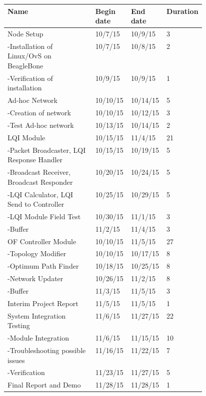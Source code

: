 \documentclass{article}
\begin{document}
\begin{tabular}{  | p{.45\linewidth} | p{0.185\linewidth} | p{0.185\linewidth} | p{0.09\linewidth} |}
\hline
\textbf{Name}	&	\textbf{Begin date}	&	\textbf{End date}	&	\textbf{Duration} \\
\hline
Node Setup	&	10/7/15	&	10/9/15	&	3 \\
-Installation of Linux/OvS on BeagleBone	&	10/7/15	&	10/8/15	&	2 \\
-Verification of installation	&	10/9/15	&	10/9/15	&	1 \\
\hline
Ad-hoc Network	&	10/10/15	&	10/14/15	&	5 \\
-Creation of network	&	10/10/15	&	10/12/15	&	3 \\
-Test Ad-hoc network	&	10/13/15	&	10/14/15	&	2 \\
\hline
LQI Module	&	10/15/15	&	11/4/15	&	21 \\
-Packet Broadcaster, LQI Response Handler	&	10/15/15	&	10/19/15	&	5 \\
-Broadcast Receiver, Broadcast Responder	&	10/20/15	&	10/24/15	&	5 \\ 
-LQI Calculator, LQI Send to Controller	&	10/25/15	&	10/29/15	&	5 \\
-LQI Module Field Test	&	10/30/15	&	11/1/15	&	3 \\
-Buffer	&	11/2/15	&	11/4/15	&	3 \\
\hline
OF Controller Module	&	10/10/15	&	11/5/15	&	27 \\
-Topology Modifier	&	10/10/15	&	10/17/15	&	8 \\
-Optimum Path Finder	&	10/18/15	&	10/25/15	&	8 \\
-Network Updater	&	10/26/15	&	11/2/15	&	8 \\ 
-Buffer	&	11/3/15	&	11/5/15	&	3 \\
\hline
Interim Project Report	&	11/5/15	&	11/5/15	&	1 \\
\hline
System Integration Testing	&	11/6/15	&	11/27/15	&	22 \\
-Module Integration	&	11/6/15	&	11/15/15	&	10 \\
-Troubleshooting possible issues	&	11/16/15	&	11/22/15	&	7 \\
-Verification	&	11/23/15	&	11/27/15	&	5 \\
\hline
Final Report and Demo	&	11/28/15	&	11/28/15	&	1 \\
\hline
\end{tabular}
\end{document}
